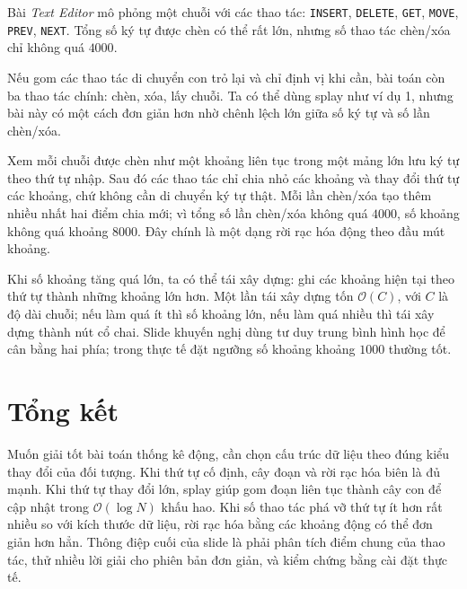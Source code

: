 \documentclass[11pt]{article}
\newcommand{\Oh}{\mathcal{O}}
\begin{document}
Bài \textit{Text Editor} mô phỏng một chuỗi với các thao tác:
\texttt{INSERT}, \texttt{DELETE}, \texttt{GET}, \texttt{MOVE},
\texttt{PREV}, \texttt{NEXT}. Tổng số ký tự được chèn có thể rất lớn, nhưng
số thao tác chèn/xóa chỉ không quá \(4000\).

Nếu gom các thao tác di chuyển con trỏ lại và chỉ định vị khi cần, bài toán
còn ba thao tác chính: chèn, xóa, lấy chuỗi. Ta có thể dùng splay như ví dụ
1, nhưng bài này có một cách đơn giản hơn nhờ chênh lệch lớn giữa số ký tự và
số lần chèn/xóa.

Xem mỗi chuỗi được chèn như một khoảng liên tục trong một mảng lớn lưu ký tự
theo thứ tự nhập. Sau đó các thao tác chỉ chia nhỏ các khoảng và thay đổi thứ
tự các khoảng, chứ không cần di chuyển ký tự thật. Mỗi lần chèn/xóa tạo thêm
nhiều nhất hai điểm chia mới; vì tổng số lần chèn/xóa không quá \(4000\), số
khoảng không quá khoảng \(8000\). Đây chính là một dạng rời rạc hóa động theo
đầu mút khoảng.

Khi số khoảng tăng quá lớn, ta có thể tái xây dựng: ghi các khoảng hiện tại
theo thứ tự thành những khoảng lớn hơn. Một lần tái xây dựng tốn \(\Oh(C)\),
với \(C\) là độ dài chuỗi; nếu làm quá ít thì số khoảng lớn, nếu làm quá nhiều
thì tái xây dựng thành nút cổ chai. Slide khuyến nghị dùng tư duy trung bình
hình học để cân bằng hai phía; trong thực tế đặt ngưỡng số khoảng khoảng
\(1000\) thường tốt.

\section{Tổng kết}

Muốn giải tốt bài toán thống kê động, cần chọn cấu trúc dữ liệu theo đúng kiểu
thay đổi của đối tượng. Khi thứ tự cố định, cây đoạn và rời rạc hóa biên là
đủ mạnh. Khi thứ tự thay đổi lớn, splay giúp gom đoạn liên tục thành cây con
để cập nhật trong \(\Oh(\log N)\) khấu hao. Khi số thao tác phá vỡ thứ tự ít
hơn rất nhiều so với kích thước dữ liệu, rời rạc hóa bằng các khoảng động có
thể đơn giản hơn hẳn. Thông điệp cuối của slide là phải phân tích điểm chung
của thao tác, thử nhiều lời giải cho phiên bản đơn giản, và kiểm chứng bằng
cài đặt thực tế.
\end{document}
